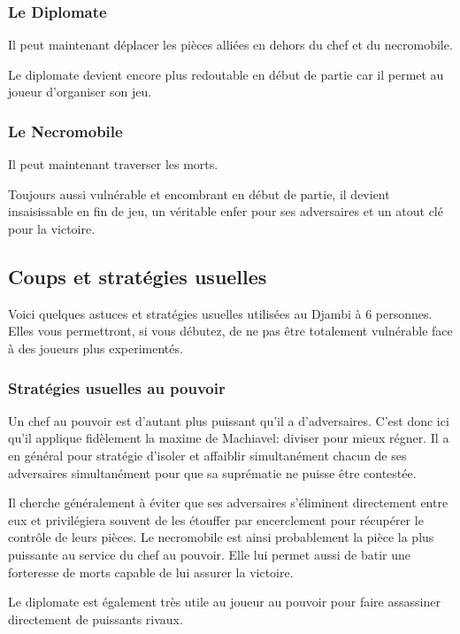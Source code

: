 \documentclass{article}
\begin{document}
\subsubsection{Le Diplomate}
Il peut maintenant déplacer les pièces alliées en dehors du chef et du necromobile.

Le diplomate devient encore plus redoutable en début de partie car il permet au joueur d'organiser son jeu.

\subsubsection{Le Necromobile}
Il peut maintenant traverser les morts.

Toujours aussi vulnérable et encombrant en début de partie, il devient insaisissable en fin de jeu, un véritable enfer pour ses adversaires et un atout clé pour la victoire.

\newpage

\subsection{Coups et stratégies usuelles}

Voici quelques astuces et stratégies usuelles utilisées au Djambi à 6 personnes. 
Elles vous permettront, si vous débutez, de ne pas être totalement vulnérable face à des joueurs plus experimentés.

\subsubsection{Stratégies usuelles au pouvoir}

Un chef au pouvoir est d'autant plus puissant qu'il a d'adversaires.
C'est donc ici qu'il applique fidèlement la maxime de Machiavel: diviser pour mieux régner.
Il a en général pour stratégie d'isoler et affaiblir simultanément chacun de ses adversaires simultanément pour que sa suprématie ne puisse être contestée.

Il cherche généralement à éviter que ses adversaires s'éliminent directement entre eux et privilégiera souvent de les étouffer par encerclement pour récupérer 
le contrôle de leurs pièces.
Le necromobile est ainsi probablement la pièce la plus puissante au service du chef au pouvoir. Elle lui permet aussi de batir une forteresse de morts 
capable de lui assurer la victoire.

Le diplomate est également très utile au joueur au pouvoir pour faire assassiner directement de puissants rivaux.
\end{document}
